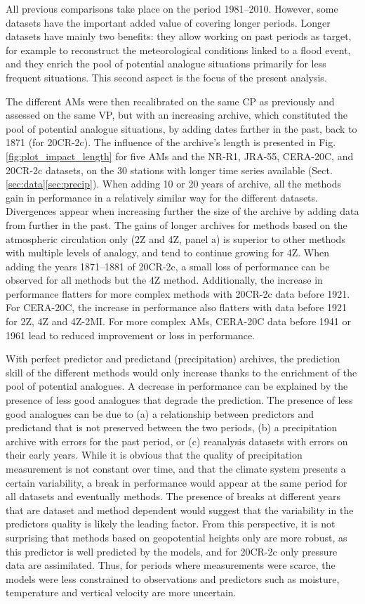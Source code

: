 \documentclass{ametsoc}
\begin{document}
All previous comparisons take place on the period 1981--2010. However, some datasets have the important added value of covering longer periods. Longer datasets have mainly two benefits: they allow working on past periods as target, for example to reconstruct the meteorological conditions linked to a flood event, and they enrich the pool of potential analogue situations primarily for less frequent situations. This second aspect is the focus of the present analysis. 

The different AMs were then recalibrated on the same CP as previously and assessed on the same VP, but with an increasing archive, which constituted the pool of potential analogue situations, by adding dates farther in the past, back to 1871 (for 20CR-2c). The influence of the archive's length is presented in Fig. \ref{fig:plot_impact_length} for five AMs and the NR-R1, JRA-55, CERA-20C, and 20CR-2c datasets, on the 30 stations with longer time series available (Sect. \ref{sec:data}\ref{sec:precip}). When adding 10 or 20 years of archive, all the methods gain in performance in a relatively similar way for the different datasets. Divergences appear when increasing further the size of the archive by adding data from further in the past. The gains of longer archives for methods based on the atmospheric circulation only (2Z and 4Z, panel a) is superior to other methods with multiple levels of analogy, and tend to continue growing for 4Z. When adding the years 1871--1881 of 20CR-2c, a small loss of performance can be observed for all methods but the 4Z method. Additionally, the increase in performance flatters for more complex methods with 20CR-2c data before 1921. For CERA-20C, the increase in performance also flatters with data before 1921 for 2Z, 4Z and 4Z-2MI. For more complex AMs, CERA-20C data before 1941 or 1961 lead to reduced improvement or loss in performance.

With perfect predictor and predictand (precipitation) archives, the prediction skill of the different methods would only increase thanks to the enrichment of the pool of potential analogues. A decrease in performance can be explained by the presence of less good analogues that degrade the prediction. The presence of less good analogues can be due to (a) a relationship between predictors and predictand that is not preserved between the two periods, (b) a precipitation archive with errors for the past period, or (c) reanalysis datasets with errors on their early years. While it is obvious that the quality of precipitation measurement is not constant over time, and that the climate system presents a certain variability, a break in performance would appear at the same period for all datasets and eventually methods. The presence of breaks at different years that are dataset and method dependent would suggest that the variability in the predictors quality is likely the leading factor. From this perspective, it is not surprising that methods based on geopotential heights only are more robust, as this predictor is well predicted by the models, and for 20CR-2c only pressure data are assimilated. Thus, for periods where measurements were scarce, the models were less constrained to observations and predictors such as moisture, temperature and vertical velocity are more uncertain. 
\end{document}
